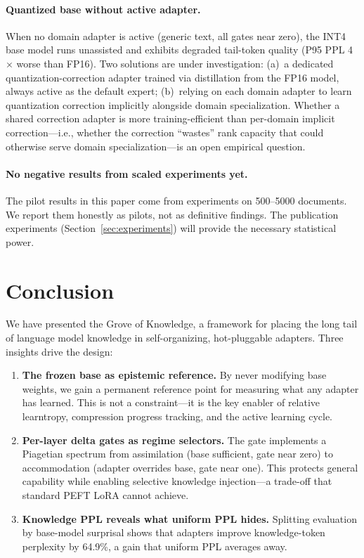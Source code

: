 \documentclass{article}
\newcommand{\grove}{Grove of Knowledge}
\begin{document}
\paragraph{Quantized base without active adapter.}
When no domain adapter is active (generic text, all gates near zero),
the INT4 base model runs unassisted and exhibits degraded tail-token
quality (P95 PPL 4$\times$ worse than FP16). Two solutions are under
investigation: (a)~a dedicated quantization-correction adapter trained
via distillation from the FP16 model, always active as the default
expert; (b)~relying on each domain adapter to learn quantization
correction implicitly alongside domain specialization. Whether a shared
correction adapter is more training-efficient than per-domain implicit
correction---i.e., whether the correction ``wastes'' rank capacity that
could otherwise serve domain specialization---is an open empirical
question.

\paragraph{No negative results from scaled experiments yet.}
The pilot results in this paper come from experiments on 500--5000
documents. We report them honestly as pilots, not as definitive findings.
The publication experiments (Section~\ref{sec:experiments}) will provide
the necessary statistical power.

\section{Conclusion}
\label{sec:conclusion}

We have presented the \grove{}, a framework for placing the long tail
of language model knowledge in self-organizing, hot-pluggable adapters.
Three insights drive the design:

\begin{enumerate}[nosep,leftmargin=1.5em]
\item \textbf{The frozen base as epistemic reference.} By never modifying
      base weights, we gain a permanent reference point for measuring
      what any adapter has learned. This is not a constraint---it is the
      key enabler of relative learntropy, compression progress tracking,
      and the active learning cycle.
\item \textbf{Per-layer delta gates as regime selectors.} The gate
      implements a Piagetian spectrum from assimilation (base sufficient,
      gate near zero) to accommodation (adapter overrides base, gate
      near one). This protects general capability while enabling
      selective knowledge injection---a trade-off that standard PEFT
      LoRA cannot achieve.
\item \textbf{Knowledge PPL reveals what uniform PPL hides.} Splitting
      evaluation by base-model surprisal shows that adapters improve
      knowledge-token perplexity by 64.9\%, a gain that uniform PPL
      averages away.
\end{enumerate}
\end{document}
